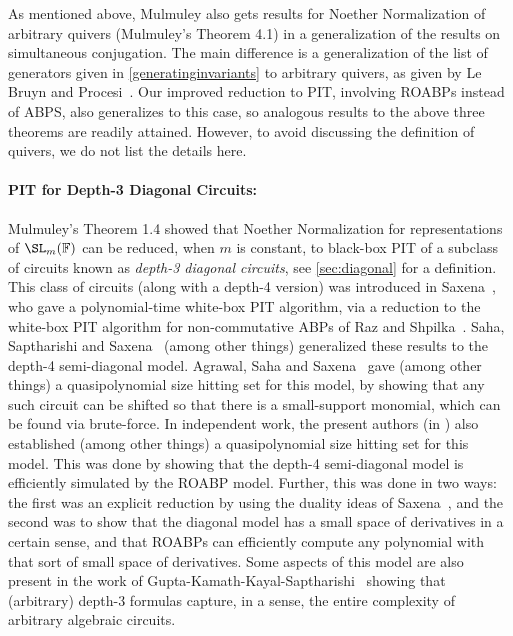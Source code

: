 \documentclass[letterpaper,11pt]{article}
\numberwithin{equation}{section}
\theoremstyle{plain}
\theoremstyle{remark}
\newcommand{\F}{\mathbb{F}}
\begin{document}
As mentioned above, Mulmuley also gets results for Noether Normalization of arbitrary quivers (Mulmuley's Theorem 4.1) in a generalization of the results on simultaneous conjugation.  The main difference is a generalization of the list of generators given in \autoref{generatinginvariants} to arbitrary quivers, as given by Le Bruyn and Procesi~\cite{LeBruynProcesi90}. Our improved reduction to PIT, involving ROABPs instead of ABPS, also generalizes to this case, so analogous results to the above three theorems are readily attained.  However, to avoid discussing the definition of quivers, we do not list the details here.

\paragraph{PIT for Depth-3 Diagonal Circuits:} Mulmuley's Theorem 1.4 showed that Noether Normalization for representations of $\SL_m(\F)$ can be reduced, when $m$ is constant, to black-box PIT of a subclass of circuits known as \textit{depth-3 diagonal circuits}, see \autoref{sec:diagonal} for a definition.  This class of circuits (along with a depth-4 version) was introduced in Saxena~\cite{Saxena08}, who gave a polynomial-time white-box PIT algorithm, via a reduction to the white-box PIT algorithm for non-commutative ABPs of Raz and Shpilka~\cite{RazShpilka05}.  Saha, Saptharishi and Saxena~\cite{SahaSS11} (among other things) generalized these results to the depth-4 semi-diagonal model.  Agrawal, Saha and Saxena~\cite{AgrawalSS12} gave (among other things) a quasipolynomial size hitting set for this model, by showing that any such circuit can be shifted so that there is a small-support monomial, which can be found via brute-force.  In independent work, the present authors (in \cite{ForbesShpilka12a}) also established (among other things) a quasipolynomial size hitting set for this model.  This was done by showing that the depth-4 semi-diagonal model is efficiently simulated by the ROABP model.  Further, this was done in two ways: the first was an explicit reduction by using the duality ideas of Saxena~\cite{Saxena08}, and the second was to show that the diagonal model has a small space of derivatives in a certain sense, and that ROABPs can efficiently compute any polynomial with that sort of small space of derivatives.  Some aspects of this model are also present in the work of Gupta-Kamath-Kayal-Saptharishi~\cite{GuptaKKS13} showing that (arbitrary) depth-3 formulas capture, in a sense, the entire complexity of arbitrary algebraic circuits.
\end{document}
